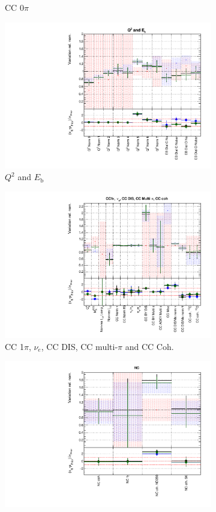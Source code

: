 \begin{figure}[!htbp]
\begin{subfigure}{0.49\textwidth}
  \caption{CC 0$\pi$}
\end{subfigure}
\begin{subfigure}{0.49\textwidth}
  \centering
  \includegraphics[width=0.9\linewidth]{figs/polydataxsec_2}
  \caption{$Q^2$ and $E_{\mathrm{b}}$}
\end{subfigure}
\begin{subfigure}{0.49\textwidth}
  \centering
  \includegraphics[width=0.9\linewidth]{figs/polydataxsec_3}
  \caption{CC 1$\pi$, $\nu_e$, CC DIS, CC multi-$\pi$ and CC Coh.}
\end{subfigure}
\begin{subfigure}{0.49\textwidth}
  \centering
  \includegraphics[width=0.9\linewidth]{figs/polydataxsec_4}

\end{subfigure}
\end{figure}
